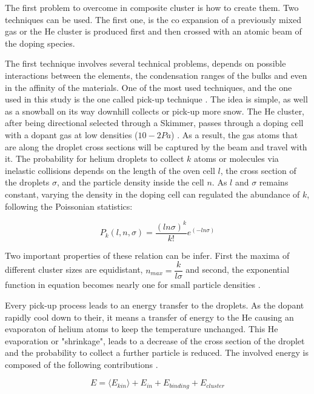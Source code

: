 The first problem to overcome in composite cluster  is how to create them. Two techniques can be used. The first one, is the co expansion of
a previously mixed gas \cite{tchaplyguine_variable_2004} or the He cluster is produced first and then crossed with an atomic beam of the doping species.

The first technique  involves several technical problems, depends on possible interactions between the elements, the condensation ranges of the bulks and even in the  affinity  of the materials. One of the most used techniques, and the one used in this study is the one called pick-up technique \cite{gough_infrared_1985}. The idea is simple, as well as a snowball on its way downhill collects or pick-up more snow. The He cluster, after being directional selected through a Skimmer,  passes through a doping cell with a dopant gas at low densities ($10−2 Pa$) \cite{stienkemeier_spectroscopy_2006}. As a result, the gas atoms that are along the droplet cross sections will be captured by the beam and travel with it. The probability for helium droplets to collect $k$ atoms or molecules via inelastic collisions depends on the length of the oven cell $l$, the cross section of the droplets $\sigma$, and the particle density inside the cell $n$. As $l$ and $\sigma$ remains constant, varying the density in the doping cell can  regulated the abundance of $k$, following the Poissonian statistics:

\begin{equation}
P_{k}(l,n,\sigma)=\dfrac{(ln\sigma)^{k}}{k!} e^{(-ln\sigma)}
\end{equation}

Two important properties of these relation can be infer. First the maxima of different cluster sizes  are equidistant, $n_{max}=\dfrac{k}{l\sigma}$ and second, the exponential function in equation  becomes  nearly  one for  small  particle  densities \cite{bunermann_modeling_2011}.

Every pick-up process leads to an energy transfer to the droplets. As the dopant rapidly cool down to their, it means a transfer of energy to the He causing an  evaporaton of  helium atoms to keep the temperature unchanged. This He evaporation or "shrinkage", leads to a decrease of the cross section of the droplet and the probability to collect a further particle is  reduced. The involved energy is composed of the following contributions \cite{bunermann_modeling_2011}.

\begin{equation}
E=\langle E_{kin}\rangle + E_{in} + E_{binding} + E_{cluster}
\end{equation}

